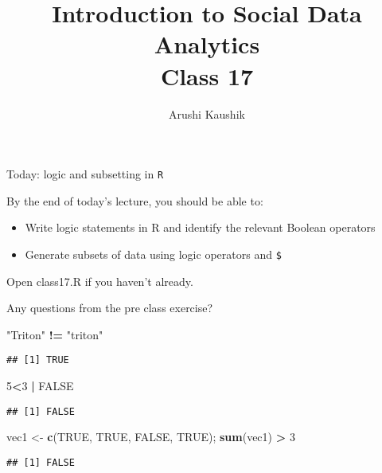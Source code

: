 \documentclass[ignorenonframetext,]{beamer}
\title[Class 17]{Introduction to Social Data Analytics\\
	Class 17}
\author[Kaushik]{Arushi Kaushik}
\institute[UCSD]{arkaushi@ucsd.edu}
\newenvironment{Shaded}{\begin{snugshade}}{\end{snugshade}}
\newcommand{\KeywordTok}[1]{\textcolor[rgb]{0.13,0.29,0.53}{\textbf{#1}}}
\newcommand{\DecValTok}[1]{\textcolor[rgb]{0.00,0.00,0.81}{#1}}
\newcommand{\StringTok}[1]{\textcolor[rgb]{0.31,0.60,0.02}{#1}}
\newcommand{\OtherTok}[1]{\textcolor[rgb]{0.56,0.35,0.01}{#1}}
\newcommand{\OperatorTok}[1]{\textcolor[rgb]{0.81,0.36,0.00}{\textbf{#1}}}
\newcommand{\NormalTok}[1]{#1}
\providecommand{\tightlist}{%
	\setlength{\itemsep}{0pt}\setlength{\parskip}{0pt}}
\begin{document}
\frame{\titlepage}

\begin{frame}{Today: logic and subsetting in \texttt{R}}

By the end of today's lecture, you should be able to:

\begin{itemize}
\tightlist
\item
  Write logic statements in R and identify the relevant Boolean
  operators
\item
  Generate subsets of data using logic operators and \texttt{\$}
\end{itemize}

Open class17.R if you haven't already.

\end{frame}

\begin{frame}[fragile]{Any questions from the pre class exercise?}

\begin{Shaded}
\begin{Highlighting}[]
\StringTok{"Triton"} \OperatorTok{!=}\StringTok{ "triton"}
\end{Highlighting}
\end{Shaded}

\begin{verbatim}
## [1] TRUE
\end{verbatim}

\begin{Shaded}
\begin{Highlighting}[]
\DecValTok{5}\OperatorTok{<}\DecValTok{3} \OperatorTok{|}\StringTok{ }\OtherTok{FALSE}
\end{Highlighting}
\end{Shaded}

\begin{verbatim}
## [1] FALSE
\end{verbatim}

\begin{Shaded}
\begin{Highlighting}[]
\NormalTok{vec1 <-}\StringTok{ }\KeywordTok{c}\NormalTok{(}\OtherTok{TRUE}\NormalTok{, }\OtherTok{TRUE}\NormalTok{, }\OtherTok{FALSE}\NormalTok{, }\OtherTok{TRUE}\NormalTok{); }\KeywordTok{sum}\NormalTok{(vec1) }\OperatorTok{>}\StringTok{ }\DecValTok{3}
\end{Highlighting}
\end{Shaded}

\begin{verbatim}
## [1] FALSE
\end{verbatim}

\end{frame}
\end{document}
